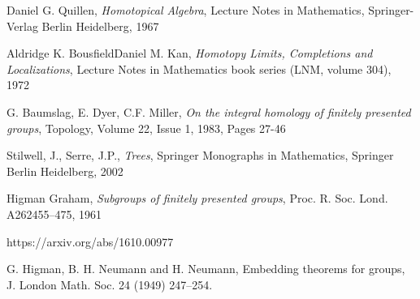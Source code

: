\documentclass[14pt, dvipsnames]{extarticle}
\theoremstyle{definition}
\theoremstyle{remark}
\begin{document}
\begin{thebibliography}{}
Daniel G. Quillen, {\it Homotopical Algebra}, Lecture Notes in Mathematics, Springer-Verlag Berlin Heidelberg, 1967






Aldridge K. BousfieldDaniel M. Kan, {\it Homotopy Limits, Completions and Localizations},  Lecture Notes in Mathematics book series (LNM, volume 304), 1972





G. Baumslag, E. Dyer, C.F. Miller, {\it On the integral homology of finitely presented groups}, Topology, Volume 22, Issue 1, 1983, Pages 27-46



Stilwell, J., Serre, J.P., {\it Trees}, Springer Monographs in Mathematics, Springer Berlin Heidelberg, 2002



Higman Graham,  {\it Subgroups of finitely presented groups}, Proc. R. Soc. Lond. A262455–475, 1961


https://arxiv.org/abs/1610.00977


G. Higman, B. H. Neumann and H. Neumann, Embedding theorems for groups, J. London Math. Soc. 24 (1949) 247–254.






\end{thebibliography}
\end{document}
